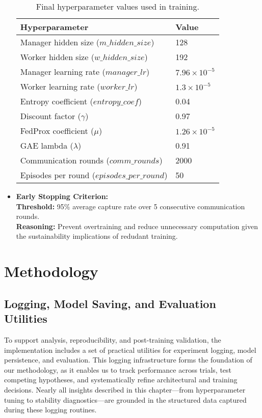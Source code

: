 \documentclass[12pt,a4paper,twoside,openany]{book}
\begin{document}
\begin{itemize}
\vspace{1em}
\begin{table}[h]
\centering
\small
\begin{tabular}{l l}
\toprule
\textbf{Hyperparameter} & \textbf{Value} \\
\midrule
Manager hidden size ($m\_hidden\_size$) & 128 \\
Worker hidden size ($w\_hidden\_size$) & 192 \\
Manager learning rate ($manager\_lr$) & $7.96 \times 10^{-5}$ \\
Worker learning rate ($worker\_lr$) & $1.3 \times 10^{-5}$ \\
Entropy coefficient ($entropy\_coef$) & 0.04 \\
Discount factor ($\gamma$) & 0.97 \\
FedProx coefficient ($\mu$) & $1.26 \times 10^{-5}$ \\
GAE lambda ($\lambda$) & 0.91 \\
Communication rounds ($comm\_rounds$) & 2000 \\
Episodes per round ($episodes\_per\_round$) & 50 \\
\bottomrule
\end{tabular}
\caption{Final hyperparameter values used in training.}
\label{tab:final_hyperparameters}
\end{table}

\item \textbf{Early Stopping Criterion:} \\
  \textbf{Threshold:} 95\% average capture rate over 5 consecutive communication rounds. \\
  \textbf{Reasoning:} Prevent overtraining and reduce unnecessary computation given the sustainability implications of redudant training.
\end{itemize}

\section{Methodology}

\subsection{Logging, Model Saving, and Evaluation Utilities}

To support analysis, reproducibility, and post-training validation, the implementation includes a set of practical utilities for experiment logging, model persistence, and evaluation. This logging infrastructure forms the foundation of our methodology, as it enables us to track performance across trials, test competing hypotheses, and systematically refine architectural and training decisions. Nearly all insights described in this chapter—from hyperparameter tuning to stability diagnostics—are grounded in the structured data captured during these logging routines.
\end{document}
